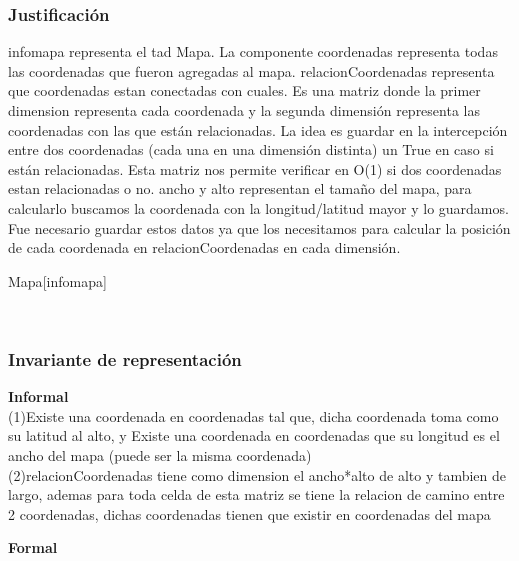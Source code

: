 \begin{Representacion}
\subsubsection{Justificación}
infomapa representa el tad Mapa. La componente coordenadas representa todas las coordenadas que fueron agregadas al mapa.
relacionCoordenadas representa que coordenadas estan conectadas con cuales. Es una matriz donde la primer dimension representa cada coordenada y la segunda dimensi\'on representa las coordenadas con las que est\'an relacionadas. La idea es guardar en la intercepci\'on entre dos coordenadas (cada una en una dimensi\'on distinta) un True en caso si están relacionadas. Esta matriz nos permite verificar en O(1) si dos coordenadas estan relacionadas o no.
ancho y alto representan el tama\~no del mapa, para calcularlo buscamos la coordenada con la longitud/latitud mayor y lo guardamos. Fue necesario guardar estos datos ya que los necesitamos para calcular la posici\'on de cada coordenada en relacionCoordenadas en cada dimensi\'on.

	\begin{Estructura}{Mapa}[infomapa]
		\begin{Tupla}[infomapa]
			\\
		\end{Tupla}
	\end{Estructura}

\subsubsection{Invariante de representación}

\textbf{Informal}\\
(1)Existe una coordenada en coordenadas tal que, dicha coordenada toma como su latitud al alto, y Existe una coordenada en coordenadas que su longitud es el ancho del mapa (puede ser la misma coordenada)\\
(2)relacionCoordenadas tiene como dimension el ancho*alto de alto y tambien de largo, ademas para toda celda de esta matriz se tiene la relacion de camino entre 2 coordenadas, dichas coordenadas tienen que existir en coordenadas del mapa 

\textbf{Formal}\\



\end{Representacion}
